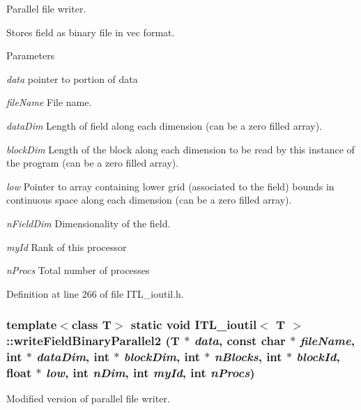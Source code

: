 Parallel file writer. 

Stores field as binary file in vec format. 
\begin{DoxyParams}{Parameters}
\item[{\em data}]pointer to portion of data \item[{\em fileName}]File name. \item[{\em dataDim}]Length of field along each dimension (can be a zero filled array). \item[{\em blockDim}]Length of the block along each dimension to be read by this instance of the program (can be a zero filled array). \item[{\em low}]Pointer to array containing lower grid (associated to the field) bounds in continuous space along each dimension (can be a zero filled array). \item[{\em nFieldDim}]Dimensionality of the field. \item[{\em myId}]Rank of this processor \item[{\em nProcs}]Total number of processes \end{DoxyParams}


Definition at line 266 of file ITL\_\-ioutil.h.

\hypertarget{classITL__ioutil_acb4e02d17a9e6df557788862498a3f6a}{
\subsubsection[{writeFieldBinaryParallel2}]{\setlength{\rightskip}{0pt plus 5cm}template$<$class T$>$ static void {\bf ITL\_\-ioutil}$<$ T $>$::writeFieldBinaryParallel2 (T $\ast$ {\em data}, \/  const char $\ast$ {\em fileName}, \/  int $\ast$ {\em dataDim}, \/  int $\ast$ {\em blockDim}, \/  int $\ast$ {\em nBlocks}, \/  int $\ast$ {\em blockId}, \/  float $\ast$ {\em low}, \/  int {\em nDim}, \/  int {\em myId}, \/  int {\em nProcs})}}
\label{classITL__ioutil_acb4e02d17a9e6df557788862498a3f6a}


Modified version of parallel file writer. 

